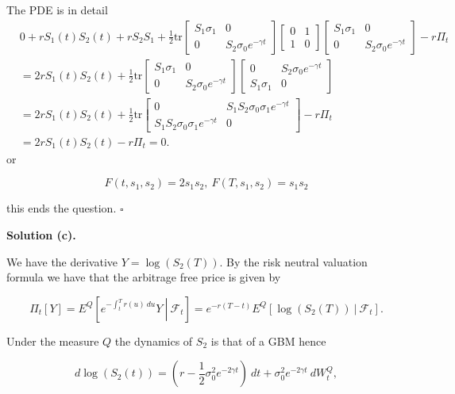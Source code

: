 \documentclass[a4paper,12pt,openany]{book}
\begin{document}
The PDE is in detail
\begin{align*}
&0+rS_1(t)S_2(t)+rS_2S_1+\frac{1}{2}\text{tr}
\begin{bmatrix}
S_1\sigma_1 & 0\\
0 & S_2\sigma_0 e^{-\gamma t}
\end{bmatrix}
\begin{bmatrix}
0 & 1\\
1 & 0 
\end{bmatrix}
\begin{bmatrix}
S_1\sigma_1 & 0\\
0 & S_2\sigma_0 e^{-\gamma t}
\end{bmatrix} -r\Pi_t\\
&=2rS_1(t)S_2(t)+\frac{1}{2}\text{tr}
\begin{bmatrix}
S_1\sigma_1 & 0\\
0 & S_2\sigma_0 e^{-\gamma t}
\end{bmatrix}
\begin{bmatrix}
0 & S_2\sigma_0 e^{-\gamma t}\\
S_1\sigma_1 & 0
\end{bmatrix}\\
&=2rS_1(t)S_2(t)+\frac{1}{2}\text{tr}
\begin{bmatrix}
0 & S_1S_2\sigma_0\sigma_1e^{-\gamma t}\\
S_1S_2\sigma_0\sigma_1e^{-\gamma t} & 0
\end{bmatrix}-r\Pi_t\\
&=2rS_1(t)S_2(t)-r\Pi_t=0.
\end{align*}
or

\[
F(t,s_1,s_2)=2s_1s_2,\ F(T,s_1,s_2)=s_1s_2
\]

this ends the question. \(\square\)

\noindent\makebox[\linewidth]{\rule{\textwidth}{0.4pt}}

\textbf{Solution (c).}

We have the derivative \(Y=\log(S_2(T))\). By the risk neutral valuation formula we have that the arbitrage free price is given by

\[
\Pi_t[Y]=E^Q\left[\left.e^{-\int_t^Tr(u)\ du}Y\ \right\vert\ \mathcal{F}_t\right]=e^{-r(T-t)}E^Q\left[\left.\log(S_2(T))\ \right\vert\ \mathcal{F}_t\right].
\]

Under the measure \(Q\) the dynamics of \(S_2\) is that of a GBM hence

\[
d\log(S_2(t))=\left(r-\frac{1}{2}\sigma_0^2e^{-2\gamma t}\right)\ dt+\sigma_0^2e^{-2\gamma t}\ dW^Q_t,
\]
\end{document}
